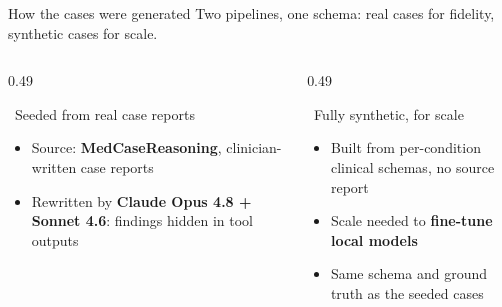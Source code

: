 \documentclass[aspectratio=169,t]{beamer}
\begin{document}
\begin{frame}{How the cases were generated}
  \centering\footnotesize\color{CERNtextdark}
  Two pipelines, one schema: real cases for fidelity, synthetic cases for scale.

  \vspace{1.5mm}
  \begin{columns}[T,onlytextwidth]
    \begin{column}{0.49\textwidth}
      \begin{block}{\faBookMedical\;\, Seeded from real case reports}
        \footnotesize
        \begin{itemize}\setlength\itemsep{0.25em}
          \item Source: \textbf{MedCaseReasoning}, clinician-written case reports
          \item Rewritten by \textbf{Claude Opus 4.8 + Sonnet 4.6}: findings
                hidden in tool outputs
        \end{itemize}
      \end{block}
    \end{column}%
    \hfill
    \begin{column}{0.49\textwidth}
      \begin{alertblock}{\faRobot\;\, Fully synthetic, for scale}
        \footnotesize
        \begin{itemize}\setlength\itemsep{0.25em}
          \item Built from per-condition clinical schemas, no source report
          \item Scale needed to \textbf{fine-tune local models}
          \item Same schema and ground truth as the seeded cases
        \end{itemize}
      \end{alertblock}
    \end{column}
  \end{columns}

\end{frame}
\end{document}

